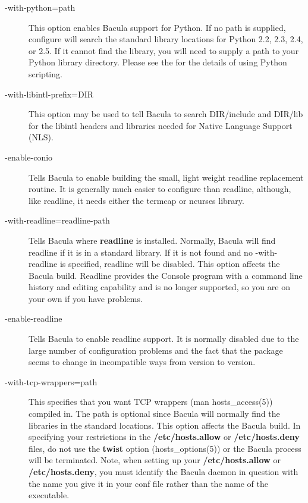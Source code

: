 \begin{description}
\item [ {-}{\-}with-python=\lt{}path\gt{}]
   This option enables Bacula support for Python.  If no path is supplied,
   configure will search the standard library locations for Python 2.2,
   2.3, 2.4, or 2.5.  If it cannot find the library, you will need to
   supply a path to your Python library directory.  Please see the
    for the details of using Python
   scripting.

\item [ {-}{\-}with-libintl-prefix=\lt{}DIR\gt{}]
   This option may be used to tell Bacula to search DIR/include and
   DIR/lib for the libintl headers and libraries needed for Native
   Language Support (NLS).

\item [ {-}{\-}enable-conio]
   Tells Bacula to enable building the small, light weight readline
   replacement routine.  It is generally much easier to configure than
   readline, although, like readline, it needs either the termcap or
   ncurses library.

\item [ {-}{\-}with-readline=\lt{}readline-path\gt{}]
   Tells Bacula where {\bf readline} is installed.  Normally, Bacula will
   find readline if it is in a standard library.  If it is not found and no
   {-}{\-}with-readline is specified, readline will be disabled.  This
   option affects the Bacula build.  Readline provides the Console program
   with a command line history and editing capability and is no longer
   supported, so you are on your own if you have problems.

\item [ {-}{\-}enable-readline]
   Tells Bacula to enable readline support.  It is normally disabled due to the
   large number of configuration  problems and the fact that the package seems to
   change in incompatible  ways from version to version.  

\item [ {-}{\-}with-tcp-wrappers=\lt{}path\gt{}]
   This specifies that you  want TCP wrappers (man hosts\_access(5)) compiled in.
   The path is optional since  Bacula will normally find the libraries in the
   standard locations.  This option affects the Bacula build.  In specifying your
   restrictions in the {\bf /etc/hosts.allow}  or {\bf /etc/hosts.deny} files, do
   not use the {\bf twist}  option (hosts\_options(5)) or the Bacula process will
   be terminated. Note, when setting up your {\bf /etc/hosts.allow}
   or {\bf /etc/hosts.deny}, you must identify the Bacula daemon in
   question with the name you give it in your conf file rather than the
   name of the executable.
   

\end{description}
